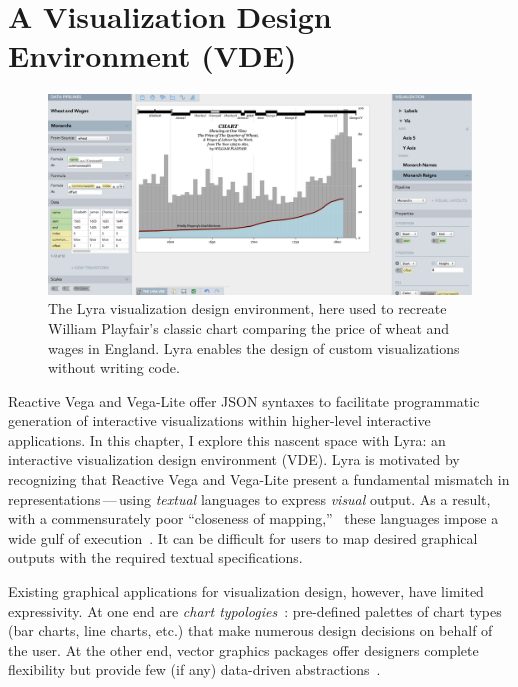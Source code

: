 \graphicspath{{./lyra/figures/}}
\chapter{A Visualization Design Environment (VDE)}
\label{sec:lyra}

\begin{figure}[h!]
  \vspace{-40pt}
  \centering
  \includegraphics[width=\columnwidth]{playfair}
  \caption{The Lyra visualization design environment, here used to recreate William Playfair's classic chart comparing the price of wheat and wages in England. Lyra enables the design of custom visualizations without writing code.}
  \label{fig:lyra:teaser}
\end{figure}

Reactive Vega and Vega-Lite offer JSON syntaxes to facilitate programmatic
generation of interactive visualizations within higher-level interactive
applications. In this chapter, I explore this nascent space with Lyra: an
interactive visualization design environment (VDE). Lyra is motivated by
recognizing that Reactive Vega and Vega-Lite present a fundamental mismatch in
representations\,---\,using \emph{textual} languages to express \emph{visual}
output. As a result, with a commensurately poor ``closeness of
mapping,''~\cite{blackwell:cogdim} these languages impose a wide gulf of
execution~\cite{hutchins:directmanip}. It can be difficult for users to map
desired graphical outputs with the required textual specifications.

Existing graphical applications for visualization design, however, have limited
expressivity. At one end are \emph{chart typologies}~\cite{wilkinson:grammar}:
pre-defined palettes of chart types (bar charts, line charts, etc.) that make
numerous design decisions on behalf of the user. At the other end, vector
graphics packages offer designers complete flexibility but provide few (if any)
data-driven abstractions~\cite{bigelow:reflections}.






